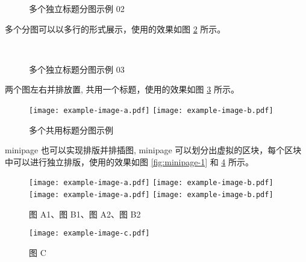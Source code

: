 \documentclass[report,oneside,UTF8,zihao=-4]{config}
\begin{document}
\begin{figure}[H]
    \centering
    \caption{多个独立标题分图示例 02}
    \label{fig:multi-image-02}
\end{figure}

多个分图可以以多行的形式展示，使用的效果如图 \ref{fig:multi-image-03} 所示。

\begin{figure}[H]
    \centering
    \\
    \caption{多个独立标题分图示例 03}
    \label{fig:multi-image-03}
\end{figure}

两个图左右并排放置, 共用一个标题，使用的效果如图 \ref{fig:multi-image-04} 所示。

\begin{figure}[H]
\centering
    \texttt{[image: example-image-a.pdf]}
    \texttt{[image: example-image-b.pdf]}
    \caption{多个共用标题分图示例}
    \label{fig:multi-image-04}
\end{figure}

minipage 也可以实现排版并排插图, minipage 可以划分出虚拟的区块，每个区块中可以进行独立排版，使用的效果如图 \ref{fig:minipage-1} 和  \ref{fig:minipage-2} 所示。

\begin{figure}[H]
    \centering
    
    \begin{minipage}[H]{0.37\linewidth} %
        \centering
        \texttt{[image: example-image-a.pdf]}
        \texttt{[image: example-image-b.pdf]}
        \\
        \texttt{[image: example-image-a.pdf]}
        \texttt{[image: example-image-b.pdf]}
        \caption{图 A1、图 B1、图 A2、图 B2}
        \label{fig:minipage-1}
    \end{minipage}
    \begin{minipage}[H]{0.37\linewidth} %
        \centering
        \texttt{[image: example-image-c.pdf]}
        \caption{图 C}
        \label{fig:minipage-2}
    \end{minipage}
    
\end{figure}
\end{document}
